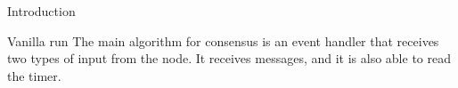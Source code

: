 \documentclass[10pt,a4paper]{article}
\begin{document}
\begin{section}{Introduction}
\begin{subsection}{Vanilla run}
The main algorithm for consensus is an event handler that receives two
types of input from the node. It receives messages, and it is also able
to read the timer.
%
%



\end{subsection}
\end{section}
\end{document}
